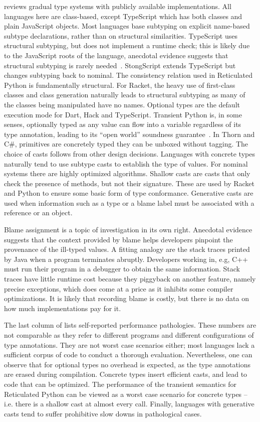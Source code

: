 \documentclass[acmlarge, anonymous, authordraft, review]{acmart} %
\begin{document}
{} reviews gradual type systems with publicly available
implementations. All languages here are class-based, except TypeScript which
has both classes and plain JavaScript objects. Most languages base subtyping
on explicit name-based subtype declarations, rather than on structural
similarities.  TypeScript uses structural subtyping, but does not implement
a runtime check; this is likely due to the JavaScript roots of the language,
anecdotal evidence suggests that structural subtyping is rarely
needed~\cite{ecoop15}. StongScript extends TypeScript but changes subtyping
back to nominal.  The consistency relation used in Reticulated Python is
fundamentally structural.  For Racket, the heavy use of first-class classes
and class generation naturally leads to structural subtyping as many of the
classes being manipulated have no names.  Optional types are the default
execution mode for Dart, Hack and TypeScript.  Transient Python is, in some
senses, optionally typed as any value can flow into a variable regardless of
its type annotation, leading to its ``open world'' soundness
guarantee~\cite{siek14}.  In Thorn and C\#, primitives are concretely
typed they can be unboxed without tagging.  The choice of casts follows from
other design decisions. Languages with concrete types naturally tend to use
subtype casts to establish the type of values. For nominal systems there are
highly optimized algorithms. Shallow casts are casts that only check the
presence of methods, but not their signature. These are used by Racket and Python
to ensure some basic form of type conformance. Generative casts are used
when information such as a type or a blame label must be associated with a
reference or an object.

Blame assignment is a topic of investigation in its own right. Anecdotal
evidence suggests that the context provided by blame helps developers
pinpoint the provenance of the ill-typed values. A fitting analogy are the
stack traces printed by Java when a program terminates abruptly. Developers
working in, e.g, C++ must run their program in a debugger to obtain the same
information. Stack traces have little runtime cost because they piggyback
on another feature, namely precise exceptions, which does come at a price as
it inhibits some compiler optimizations. It is likely that recording blame
is costly, but there is no data on how much implementations pay for it.

The last column of  lists self-reported performance pathologies.
These numbers are not comparable as they refer to different programs and
different configurations of type annotations. They are not worst case scenarios
either; most languages lack a sufficient corpus of code to conduct a thorough
evaluation.  Nevertheless, one can observe that for optional types no overhead
is expected, as the type annotations are erased during compilation. Concrete
types insert efficient casts, and lead to code that can be optimized.  The
performance of the transient semantics for Reticulated Python can be viewed as a
worst case scenario for concrete types -- i.e. there is a shallow cast at almost
every call. Finally, languages with generative casts tend to suffer prohibitive
slow downs in pathological cases.
\end{document}
